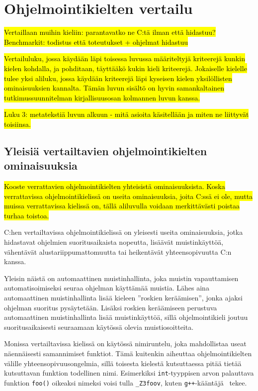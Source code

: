 \section{Ohjelmointikielten vertailu}
\label{sec:muut}

\hl{Vertaillaan muihin kieliin: parantavatko ne C:tä ilman että hidastuu?
Benchmarkit: todistus että toteutukset + ohjelmat hidastuu}

\hl{Vertailuluku, jossa käydään läpi toisessa luvussa määriteltyjä kriteerejä
kunkin kielen kohdalla, ja pohditaan, täyttääkö kukin kieli kriteerejä.
Jokaiselle kielelle tulee yksi aliluku, jossa käydään kriteerejä läpi kyseisen
kielen yksilöllisten ominaisuuksien kannalta. Tämän luvun sisältö on hyvin
samankaltainen tutkimussuunnitelman kirjallisuusosan kolmannen luvun kanssa.}

\hl{ Luku 3: metatekstiä luvun alkuun - mitä asioita käsitellään ja miten ne
liittyvät toisiinsa. }

\subsection{Yleisiä vertailtavien ohjelmointikielten ominaisuuksia}
\label{sec:muut:common}

\hl{Kooste verrattavien ohjelmointikielten yhteisistä ominaisuuksista. Koska
verrattavissa ohjelmointikielissä on useita ominaisuuksia, joita C:ssä ei ole,
mutta muissa verrattavissa kielissä on, tällä aliluvulla voidaan merkittävästi
poistaa turhaa toistoa.}

C:hen vertailtavissa ohjelmointikielissä on yleisesti useita ominaisuuksia,
jotka hidastavat ohjelmien suoritusaikaista nopeutta, lisäävät muistinkäyttöä,
vähentävät alustariippumattomuutta tai heikentävät yhteensopivuutta C:n kanssa.

Yleisin näistä on automaattinen muistinhallinta, joka muistin vapauttamisen
automatisoimiseksi seuraa ohjelman käyttämää muistia. Lähes aina automaattinen
muistinhallinta lisää kieleen ''roskien keräämisen'', jonka ajaksi ohjelman suoritus pysäytetään. Lisäksi roskien
keräämiseen perustuva automaattinen muistinhallinta lisää muistinkäyttöä, sillä
ohjelmointikieli joutuu suoritusaikaisesti seuraamaan käytössä olevia
muistiosoitteita.

Monissa vertailtavissa kielissä on käytössä nimiruntelu,
joka mahdollistaa useat näennäisesti samannimiset funktiot. Tämä kuitenkin
aiheuttaa ohjelmointikielten välille yhteensopivuusongelmia, sillä toisesta
kielestä kutsuttaessa pitää tietää kutsuttavan funktion todellinen nimi.
Esimerkiksi \texttt{int}-tyyppisen arvon palauttava funktion \texttt{foo()}
oikeaksi nimeksi voisi tulla \texttt{\_Z3foov}, kuten
\texttt{g++}-kääntäjä~\citep{gcc} tekee.

